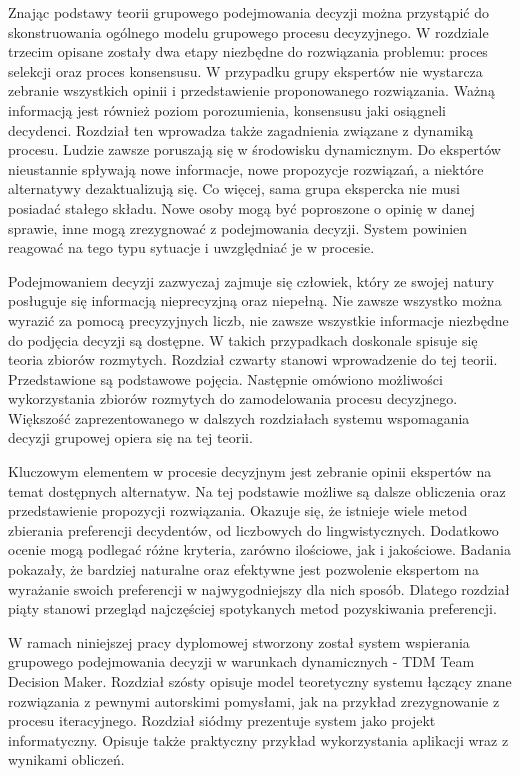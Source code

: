 Znając podstawy teorii grupowego podejmowania decyzji można przystąpić do
skonstruowania ogólnego modelu grupowego procesu decyzyjnego. W rozdziale
trzecim opisane zostały dwa etapy niezbędne do rozwiązania problemu: proces
selekcji oraz proces konsensusu. W przypadku grupy ekspertów nie wystarcza
zebranie wszystkich opinii i przedstawienie proponowanego rozwiązania. Ważną
informacją jest również poziom porozumienia, konsensusu jaki osiągneli
decydenci. Rozdział ten wprowadza także zagadnienia związane z dynamiką procesu.
Ludzie zawsze poruszają się w środowisku dynamicznym. Do ekspertów nieustannie
spływają nowe informacje, nowe propozycje rozwiązań, a niektóre alternatywy
dezaktualizują się. Co więcej, sama grupa ekspercka nie musi posiadać stałego
składu. Nowe osoby mogą być poproszone o opinię w danej sprawie, inne mogą
zrezygnować z podejmowania decyzji. System powinien reagować na tego typu
sytuacje i uwzględniać je w procesie.

Podejmowaniem decyzji zazwyczaj zajmuje się człowiek, który ze swojej natury
posługuje się informacją nieprecyzjną oraz niepełną. Nie zawsze wszystko można
wyrazić za pomocą precyzyjnych liczb, nie zawsze wszystkie informacje
niezbędne do podjęcia decyzji są dostępne. W takich przypadkach doskonale
spisuje się teoria zbiorów rozmytych. Rozdział czwarty stanowi wprowadzenie do
tej teorii. Przedstawione są podstawowe pojęcia. Następnie omówiono możliwości
wykorzystania zbiorów rozmytych do zamodelowania procesu decyzjnego. Większość
zaprezentowanego w dalszych rozdziałach systemu wspomagania decyzji grupowej
opiera się na tej teorii.

Kluczowym elementem w procesie decyzjnym jest zebranie opinii ekspertów na temat
dostępnych alternatyw. Na tej podstawie możliwe są dalsze obliczenia
oraz przedstawienie propozycji rozwiązania. Okazuje się, że istnieje wiele metod
zbierania preferencji decydentów, od liczbowych do lingwistycznych. Dodatkowo
ocenie mogą podlegać różne kryteria, zarówno ilościowe, jak i jakościowe.
Badania pokazały, że bardziej naturalne oraz efektywne jest pozwolenie
ekspertom na wyrażanie swoich preferencji w najwygodniejszy dla nich sposób.
Dlatego rozdział piąty stanowi przegląd najczęściej spotykanych metod
pozyskiwania preferencji.

W ramach niniejszej pracy dyplomowej stworzony został system wspierania
grupowego podejmowania decyzji w warunkach dynamicznych - TDM Team Decision Maker.
Rozdział szósty opisuje model teoretyczny systemu łączący znane rozwiązania z
pewnymi autorskimi pomysłami, jak na przykład zrezygnowanie z procesu
iteracyjnego. Rozdział siódmy prezentuje system jako projekt informatyczny.
Opisuje także praktyczny przykład wykorzystania aplikacji wraz z wynikami
obliczeń.
















